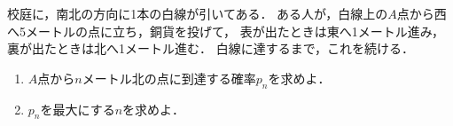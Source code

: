 \documentclass[../../main.tex]{subfiles}
\begin{document}
校庭に，南北の方向に1本の白線が引いてある．
ある人が，白線上の$A$点から西へ5メートルの点に立ち，銅貨を投げて，
表が出たときは東へ1メートル進み，裏が出たときは北へ1メートル進む．
白線に達するまで，これを続ける．
\begin{enumerate}
  \item $A$点から$n$メートル北の点に到達する確率$p_n$を求めよ．
  \item $p_n$を最大にする$n$を求めよ．
\end{enumerate}
\end{document}
